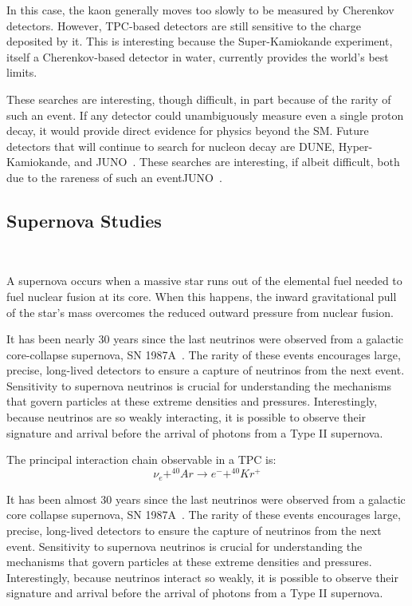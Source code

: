 In this case, the kaon generally moves too slowly to be measured by Cherenkov detectors.
However, TPC-based detectors are still sensitive to the charge deposited by it.
This is interesting because the Super-Kamiokande experiment, itself a Cherenkov-based detector in water, currently provides the world's best limits.

These searches are interesting, though difficult, in part because of the rarity of such an event.
If any detector could unambiguously measure even a single proton decay, it would provide direct evidence for physics beyond the SM.
Future detectors that will continue to search for nucleon decay are DUNE, Hyper-Kamiokande, and JUNO~\citep{DUNE_TDR_V1_Abi_2020, https://doi.org/10.48550/arxiv.1805.04163, Juno:2022103927}.
These searches are interesting, if albeit difficult, both due to the rareness of such an eventJUNO~\citep{DUNE_TDR_V1_Abi_2020, https://doi.org/10.48550/arxiv.1805.04163, Juno:2022103927}.

\subsection{Supernova Studies}~\label{sec:intro_supernova}

A supernova occurs when a massive star runs out of the elemental fuel needed to fuel nuclear fusion at its core.
When this happens, the inward gravitational pull of the star's mass overcomes the reduced outward pressure from nuclear fusion.

It has been nearly 30 years since the last neutrinos were observed from a galactic core-collapse supernova, SN 1987A~\citep{1987ApJ...322..795F}.
The rarity of these events encourages large, precise, long-lived detectors to ensure a capture of neutrinos from the next event.
Sensitivity to supernova neutrinos is crucial for understanding the mechanisms that govern particles at these extreme densities and pressures.
Interestingly, because neutrinos are so weakly interacting, it is possible to observe their signature and arrival before the arrival of photons from a Type II supernova.


The principal interaction chain observable in a TPC is:
\begin{equation}
    \nu_{e} + ^{40}Ar \rightarrow e^- + ^{40}Kr^{+}
\end{equation}

It has been almost 30 years since the last neutrinos were observed from a galactic core collapse supernova, SN 1987A~\citep{1987ApJ...322..795F}.
The rarity of these events encourages large, precise, long-lived detectors to ensure the capture of neutrinos from the next event.
Sensitivity to supernova neutrinos is crucial for understanding the mechanisms that govern particles at these extreme densities and pressures.
Interestingly, because neutrinos interact so weakly, it is possible to observe their signature and arrival before the arrival of photons from a Type II supernova.

